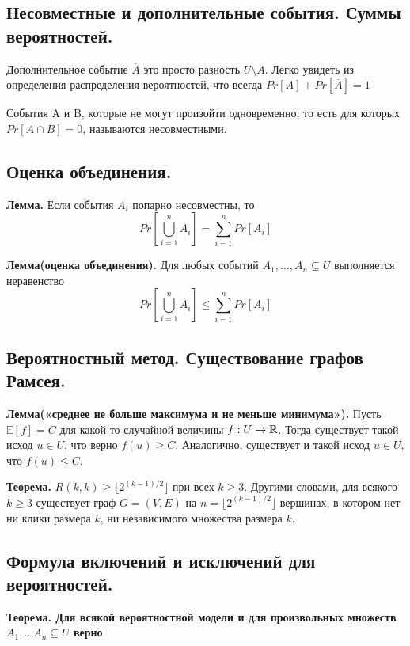 \documentclass[a4paper, 10pt]{article}
\begin{document}
\subsection{Несовместные и дополнительные события. Суммы вероятностей.}
Дополнительное событие $\overline{A}$ это просто разность $U \setminus A$. Легко увидеть из определения распределения вероятностей, что всегда $Pr[A] + Pr[\overline{A}] = 1$

События A и B, которые не могут произойти одновременно, то есть для которых $Pr[A \cap B] = 0$, называются несовместными.

\subsection{Оценка объединения.}

\textbf{Лемма.} Если события $A_i$ попарно несовместны, то $$Pr[\bigcup^{n}_{i=1}A_i] = \sum^{n}_{i=1}Pr[A_i]$$

\textbf{Лемма(оценка объединения).} Для любых событий $A_1, \dots , A_n \subseteq U$ выполняется неравенство $$Pr[\bigcup^{n}_{i=1}A_i] \leqslant \sum^{n}_{i=1}Pr[A_i]$$

\subsection{Вероятностный метод. Существование графов Рамсея.}

\textbf{Лемма(«среднее не больше максимума и не меньше минимума»).} Пусть $\mathbb{E}[f] = C$ для какой-то случайной величины $f : U \to \mathbb{R}$. Тогда существует такой исход $u \in U$, что верно $f(u) \geqslant C$. Аналогично, существует и такой исход $u \in U$, что $f(u) \leqslant C$.

\textbf{Теорема.} $R(k,k) \geqslant \lfloor 2^{(k-1)/2} \rfloor$ при всех $k \geqslant 3$. Другими словами, для всякого $k \geqslant 3$ существует граф $G = (V,E)$ на $n = \lfloor 2^{(k-1)/2} \rfloor$ вершинах, в котором нет ни клики размера $k$, ни независимого множества размера $k$.


\subsection{Формула включений и исключений для вероятностей.}


\textbf{Теорема. Для всякой вероятностной модели и для произвольных множеств $A_1, \dots A_n \subseteq U$ верно}
\end{document}
